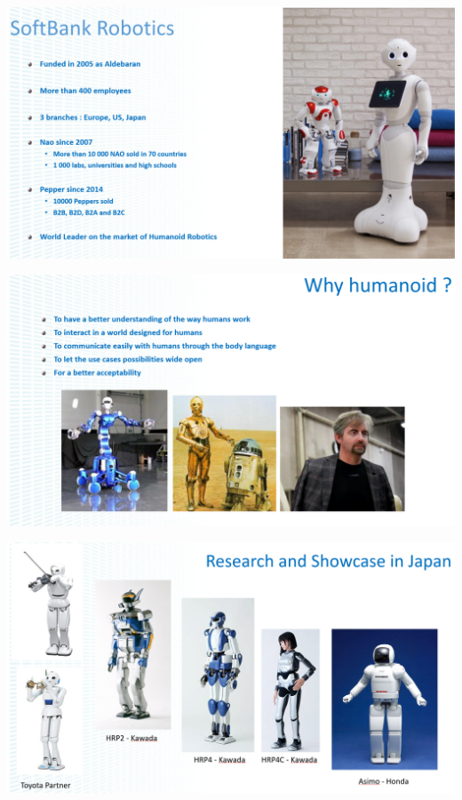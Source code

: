 \documentclass[xetex,mathserif,serif]{beamer}
\begin{document}
	\begin{frame}
		\begin{center}
			\includegraphics[width=\textwidth]{gelin1.png}
		\end{center}
	\end{frame}

	\begin{frame}
		\begin{center}
			\includegraphics[width=\textwidth]{gelin2.png}
		\end{center}
	\end{frame}

	\begin{frame}
		\begin{center}
			\includegraphics[width=\textwidth]{gelin3.png}
		\end{center}
	\end{frame}
\end{document}
